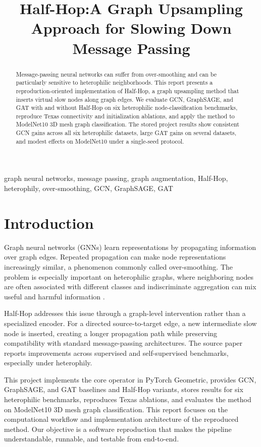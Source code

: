 \documentclass[conference]{IEEEtran}
\title{Half-Hop:A Graph Upsampling Approach for Slowing Down Message Passing}
\author{\IEEEauthorblockN{Tejinderpal Singh (202451161), Yuvraj Rajput (202451139), Ramswarup Swami (202451141)}
\IEEEauthorblockA{Department of Computer Science and Engineering\\
Indian Institute of Information Technology, Vadodara\\
Guided by Dr. Jignesh Patel}}
\begin{document}
\maketitle
\begin{abstract}
Message-passing neural networks can suffer from over-smoothing and can be particularly sensitive to heterophilic neighborhoods. This report presents a reproduction-oriented implementation of Half-Hop, a graph upsampling method that inserts virtual slow nodes along graph edges. We evaluate GCN, GraphSAGE, and GAT with and without Half-Hop on six heterophilic node-classification benchmarks, reproduce Texas connectivity and initialization ablations, and apply the method to ModelNet10 3D mesh graph classification. The stored project results show consistent GCN gains across all six heterophilic datasets, large GAT gains on several datasets, and modest effects on ModelNet10 under a single-seed protocol.
\end{abstract}
\begin{IEEEkeywords}
graph neural networks, message passing, graph augmentation, Half-Hop, heterophily, over-smoothing, GCN, GraphSAGE, GAT
\end{IEEEkeywords}

\section{Introduction}
Graph neural networks (GNNs) learn representations by propagating information over graph edges. Repeated propagation can make node representations increasingly similar, a phenomenon commonly called over-smoothing. The problem is especially important on heterophilic graphs, where neighboring nodes are often associated with different classes and indiscriminate aggregation can mix useful and harmful information \cite{pei}.

Half-Hop \cite{azabou} addresses this issue through a graph-level intervention rather than a specialized encoder. For a directed source-to-target edge, a new intermediate slow node is inserted, creating a longer propagation path while preserving compatibility with standard message-passing architectures. The source paper reports improvements across supervised and self-supervised benchmarks, especially under heterophily.

This project implements the core operator in PyTorch Geometric, provides GCN, GraphSAGE, and GAT baselines and Half-Hop variants, stores results for six heterophilic benchmarks, reproduces Texas ablations, and evaluates the method on ModelNet10 3D mesh graph classification. This report focuses on the computational workflow and implementation architecture of the reproduced method. Our objective is a software reproduction that makes the pipeline understandable, runnable, and testable from end-to-end.
\end{document}
